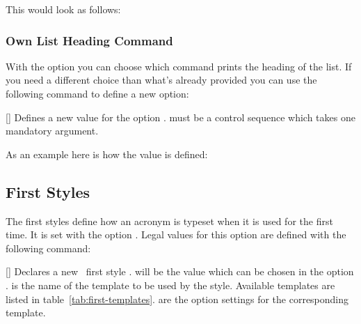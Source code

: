 \documentclass{acro-manual}
\begin{document}
\begin{sourcecode}
  \newcommand*\addcolon[1]{#1:}
\end{sourcecode}
This would look as follows:
\newcommand*\addcolon[1]{#1:}
\printacronyms

\subsubsection{Own List Heading Command}

With the option  you can choose which command prints the
heading of the list.  If you need a different choice than what's already
provided you can use the following command to define a new option:
\begin{commands}
  []
    Defines a new value  for the option .
     must be a control sequence which takes one
    mandatory argument.
\end{commands}
As an example here is how the value  is defined:
\begin{sourcecode}
\end{sourcecode}

\subsection{First Styles}
The first styles define how an acronym is typeset when it is used for the
first time.  It is set with the option .  Legal values for
this option are defined with the following command:
\begin{commands}
  []
    Declares a new \acro\ first style .   will be the
    value which can be chosen in the option .
     is the name of the template to be used by the style.
    Available templates are listed in table~\ref{tab:first-templates}.
     are the option settings for the corresponding template.
\end{commands}
\end{document}
